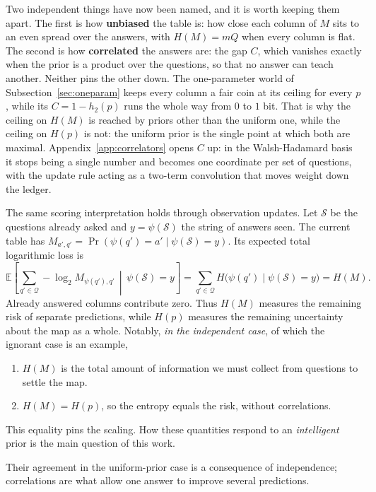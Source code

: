 \documentclass[11pt]{article}
\begin{document}
Two independent things have now been named, and it is worth keeping
them apart. The first is how \textbf{unbiased} the table is: how close
each column of $M$ sits to an even spread over the answers, with
$H(M) = mQ$ when every column is flat. The second is how
\textbf{correlated} the answers are: the gap $C$, which vanishes exactly
when the prior is a product over the questions, so that no answer can
teach another. Neither pins the other down. The one-parameter world of
Subsection~\ref{sec:oneparam} keeps every column a fair coin at its
ceiling for every $p$, while its $C = 1 - h_2(p)$ runs the whole way
from $0$ to $1$ bit. That is why the ceiling on $H(M)$ is reached by
priors other than the uniform one, while the ceiling on $H(p)$ is not:
the uniform prior is the single point at which both are maximal.
Appendix~\ref{app:correlators} opens $C$ up: in the Walsh-Hadamard
basis it stops being a single number and becomes one coordinate per
set of questions, with the update rule acting as a two-term
convolution that moves weight down the ledger.

The same scoring interpretation holds through observation updates. Let
$\mathcal S$ be the questions already asked and $y=\psi(\mathcal S)$
the string of answers seen. The current table has
$M_{a',q'}=\Pr(\psi(q')=a'\mid\psi(\mathcal S)=y)$. Its expected
total logarithmic loss is
\begin{equation}\label{eq:HM-logloss}
  \mathbb E\!\left[
    \sum_{q'\in\mathcal Q}-\log_2 M_{\psi(q'),q'}
    \,\middle|\,\psi(\mathcal S)=y\right]
  =\sum_{q'\in\mathcal Q}H\big(\psi(q')\mid\psi(\mathcal S)=y\big)
  =H(M).
\end{equation}
Already answered columns contribute zero. Thus $H(M)$ measures the
remaining risk of separate predictions, while $H(p)$ measures the
remaining uncertainty about the map as a whole. 
Notably, \emph{in the independent case}, of which the ignorant case is an example,
\begin{enumerate}
  \item $H(M)$ is the total amount of information we must collect from questions to settle the map.
  \item $H(M) = H(p)$, so the entropy equals the risk, without correlations.
\end{enumerate}
This equality pins the scaling. How these quantities respond to an \emph{intelligent} prior is the main question of this work.

Their agreement in
the uniform-prior case is a consequence of independence; correlations
are what allow one answer to improve several predictions.
\end{document}
